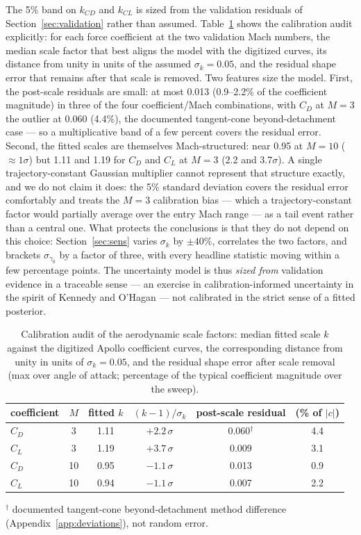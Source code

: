 The 5\% band on $k_{CD}$ and $k_{CL}$ is sized from the validation
residuals of Section~\ref{sec:validation} rather than assumed.
Table~\ref{tab:calib} shows the calibration audit explicitly: for each
force coefficient at the two validation Mach numbers, the median scale
factor that best aligns the model with the digitized curves, its distance
from unity in units of the assumed $\sigma_k=0.05$, and the residual shape
error that remains after that scale is removed. Two features size the
model. First, the post-scale residuals are small: at most 0.013
(0.9--2.2\% of the coefficient magnitude) in three of the four
coefficient/Mach combinations, with $C_D$ at $M=3$ the outlier at 0.060
(4.4\%), the documented tangent-cone beyond-detachment case --- so a
multiplicative band of a few percent covers the residual error. Second,
the fitted scales are themselves Mach-structured: near 0.95 at $M=10$
($\approx1\sigma$) but 1.11 and 1.19 for $C_D$ and $C_L$ at $M=3$ (2.2
and 3.7$\sigma$). A single trajectory-constant Gaussian multiplier cannot
represent that structure exactly, and we do not claim it does: the 5\%
standard deviation covers the residual error comfortably and treats the
$M=3$ calibration bias --- which a trajectory-constant factor would
partially average over the entry Mach range --- as a tail event rather
than a central one. What protects the conclusions is that they do not
depend on this choice: Section~\ref{sec:sens} varies $\sigma_k$ by
$\pm40\%$, correlates the two factors, and brackets $\sigma_{\gamma_0}$ by
a factor of three, with every headline statistic moving within a few
percentage points. The uncertainty model is thus \emph{sized from}
validation evidence in a traceable sense --- an exercise in
calibration-informed uncertainty in the spirit of Kennedy and O'Hagan
\cite{kennedy2001} --- not calibrated in the strict sense of a fitted
posterior.

\begin{table}[htbp]
\centering
\caption{Calibration audit of the aerodynamic scale factors: median
  fitted scale $k$ against the digitized Apollo coefficient curves, the
  corresponding distance from unity in units of $\sigma_k=0.05$, and the
  residual shape error after scale removal (max over angle of attack;
  percentage of the typical coefficient magnitude over the sweep).}
\label{tab:calib}
\begin{tabular}{lccccc}
\toprule
coefficient & $M$ & fitted $k$ & $(k-1)/\sigma_k$ &
post-scale residual & (\% of $|c|$) \\
\midrule
$C_D$ & 3  & 1.11 & $+2.2\,\sigma$ & 0.060$^{\dagger}$ & 4.4 \\
$C_L$ & 3  & 1.19 & $+3.7\,\sigma$ & 0.009 & 3.1 \\
$C_D$ & 10 & 0.95 & $-1.1\,\sigma$ & 0.013 & 0.9 \\
$C_L$ & 10 & 0.94 & $-1.1\,\sigma$ & 0.007 & 2.2 \\
\bottomrule
\end{tabular}

\smallskip
{\footnotesize $^{\dagger}$ documented tangent-cone beyond-detachment
method difference (Appendix~\ref{app:deviations}), not random error.}
\end{table}

